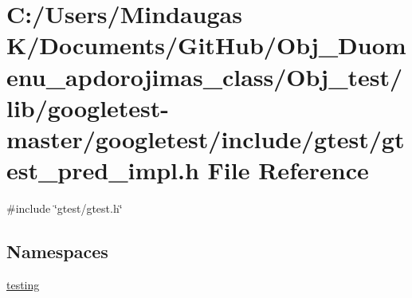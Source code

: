 \hypertarget{_obj__test_2lib_2googletest-master_2googletest_2include_2gtest_2gtest__pred__impl_8h}{}\section{C\+:/\+Users/\+Mindaugas K/\+Documents/\+Git\+Hub/\+Obj\+\_\+\+Duomenu\+\_\+apdorojimas\+\_\+class/\+Obj\+\_\+test/lib/googletest-\/master/googletest/include/gtest/gtest\+\_\+pred\+\_\+impl.h File Reference}
\label{_obj__test_2lib_2googletest-master_2googletest_2include_2gtest_2gtest__pred__impl_8h}
{\ttfamily \#include \char`\"{}gtest/gtest.\+h\char`\"{}}\newline
\subsection*{Namespaces}
\begin{DoxyCompactItemize}
\item 
 \mbox{\hyperlink{namespacetesting}{testing}}
\end{DoxyCompactItemize}
